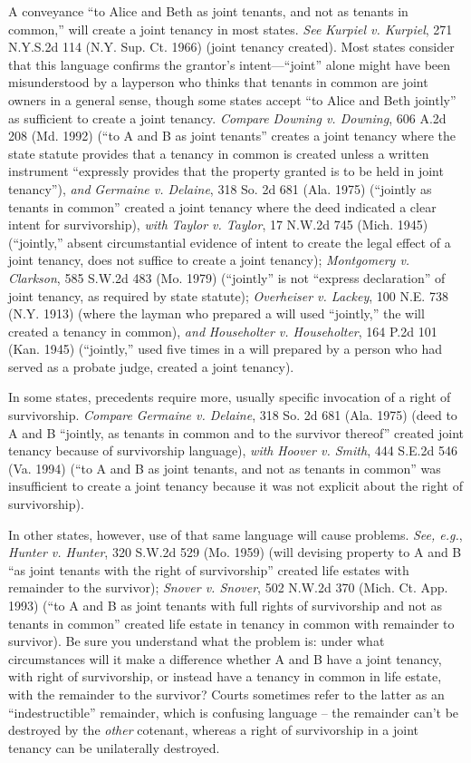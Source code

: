 A conveyance ``to Alice and Beth as joint tenants, and not as tenants in
common,'' will create a joint tenancy in most states. \textit{See} \emph{Kurpiel
v. Kurpiel}, 271 N.Y.S.2d 114 (N.Y. Sup. Ct. 1966) (joint tenancy created). Most
states consider that this language confirms the grantor's intent---``joint''
alone might have been misunderstood by a layperson who thinks that tenants in
common are joint owners in a general sense, though some states accept ``to Alice
and Beth jointly'' as sufficient to create a joint tenancy. \textit{Compare}
\emph{Downing v. Downing}, 606 A.2d 208 (Md. 1992) (``to A and B as joint
tenants'' creates a joint tenancy where the state statute provides that a
tenancy in common is created unless a written instrument ``expressly provides
that the property granted is to be held in joint tenancy''), \textit{and}
\emph{Germaine v. Delaine}, 318 So. 2d 681 (Ala. 1975) (``jointly as tenants in
common'' created a joint tenancy where the deed indicated a clear intent for
survivorship), \textit{with} \emph{Taylor v. Taylor}, 17 N.W.2d 745 (Mich. 1945)
(``jointly,'' absent circumstantial evidence of intent to create the legal
effect of a joint tenancy, does not suffice to create a joint tenancy);
\emph{Montgomery v. Clarkson}, 585 S.W.2d 483 (Mo. 1979) (``jointly'' is not
``express declaration'' of joint tenancy, as required by state statute);
\emph{Overheiser v. Lackey}, 100 N.E. 738 (N.Y. 1913) (where the layman who
prepared a will used ``jointly,'' the will created a tenancy in common),
\textit{and} \emph{Householter v. Householter}, 164 P.2d 101 (Kan. 1945)
(``jointly,'' used five times in a will prepared by a person who had served as a
probate judge, created a joint tenancy).

In some states, precedents require more, usually specific invocation of a right
of survivorship. \textit{Compare} \emph{Germaine v. Delaine}, 318 So. 2d 681
(Ala. 1975) (deed to A and B ``jointly, as tenants in common and to the survivor
thereof'' created joint tenancy because of survivorship language), \textit{with}
\emph{Hoover v. Smith}, 444 S.E.2d 546 (Va. 1994) (``to A and B as joint
tenants, and not as tenants in common'' was insufficient to create a joint
tenancy because it was not explicit about the right of survivorship).

In other states, however, use of that same language will cause problems.
\textit{See, e.g.}, \emph{Hunter v. Hunter}, 320 S.W.2d 529 (Mo. 1959) (will
devising property to A and B ``as joint tenants with the right of survivorship''
created life estates with remainder to the survivor); \emph{Snover v. Snover},
502 N.W.2d 370 (Mich. Ct. App. 1993) (``to A and B as joint tenants with full
rights of survivorship and not as tenants in common'' created life estate in
tenancy in common with remainder to survivor). Be sure you understand what the
problem is: under what circumstances will it make a difference whether A and B
have a joint tenancy, with right of survivorship, or instead have a tenancy in
common in life estate, with the remainder to the survivor? Courts sometimes
refer to the latter as an ``indestructible'' remainder, which is confusing
language -- the remainder can't be destroyed by the \textit{other} cotenant,
whereas a right of survivorship in a joint tenancy can be unilaterally
destroyed.

